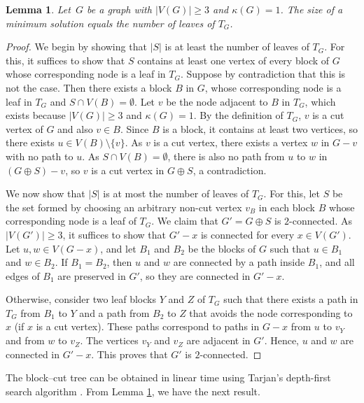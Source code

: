 \documentclass[11pt]{article}
\newtheorem{lemma}[theorem]{Lemma}
\theoremstyle{definition}
\begin{document}
\begin{lemma} \label{lemma:kappa1-leaves-TG}
Let~$G$ be a graph with $|V(G)| \geq 3$ and $\kappa(G)=1$.
The size of a minimum solution equals the number of leaves of $T_G$.
\end{lemma}
\begin{proof}
    We begin by showing that $|S|$ is at least the number of leaves of $T_G$. For this, it suffices to show that $S$ contains at least one vertex of every block of $G$ whose corresponding node is a leaf in $T_G$.
    Suppose by contradiction that this is not the case. Then there exists a block $B$ in $G$, whose corresponding node is a leaf in $T_G$ and $S \cap V(B) = \emptyset$.
    Let $v$ be the node adjacent to $B$ in $T_G$, which exists because $|V(G)| \geq 3$ and $\kappa(G)=1$. By the definition of $T_G$, $v$ is a cut vertex of $G$ and also $v\in B$. Since $B$ is a block, it contains at least two vertices, so there exists
$u \in V(B)\setminus\{v\}$. As $v$ is a cut vertex, there exists a vertex $w$ in $G-v$ with no path to $u$.
    As $S \cap V(B)= \emptyset$, there is also no path from $u$ to $w$ in $(G \oplus S)-v$, so $v$ is a cut vertex in $G \oplus S$, a contradiction.

We now show that $|S|$ is at most the number of leaves of $T_G$.
For this, let $S$ be the set formed by choosing an arbitrary non-cut vertex $v_B$ in each block $B$
whose corresponding node is a leaf of $T_G$.
We claim that $G' = G \oplus S$ is $2$-connected. 
As $|V(G')|\geq 3$,
it suffices to show that $G' - x$ is connected for every $x \in V(G')$.
Let $u,w \in V(G-x)$, and let $B_1$ and $B_2$ be the blocks of $G$ such that
$u \in B_1$ and $w \in B_2$.
If $B_1 = B_2$, then $u$ and $w$ are connected by a path inside $B_1$,
and all edges of $B_1$ are preserved in $G'$, so they are connected in $G'-x$.

Otherwise, consider two leaf blocks $Y$ and $Z$ of $T_G$ such that
there exists a path in $T_G$ from $B_1$ to $Y$ and a path from $B_2$ to $Z$
that avoids the node corresponding to $x$ (if $x$ is a cut vertex).
These paths correspond to paths in $G-x$ from $u$ to $v_Y$ and from $w$ to $v_Z$.
The vertices $v_Y$ and $v_Z$
are adjacent in $G'$. Hence, $u$ and $w$ are connected in $G'-x$.
This proves that $G'$ is $2$-connected.
\end{proof}

The block–cut tree can be obtained in linear time using Tarjan’s depth-first search algorithm \cite{tarjan1972dfs}.
From Lemma \ref{lemma:kappa1-leaves-TG}, we have the next result.
\end{document}
